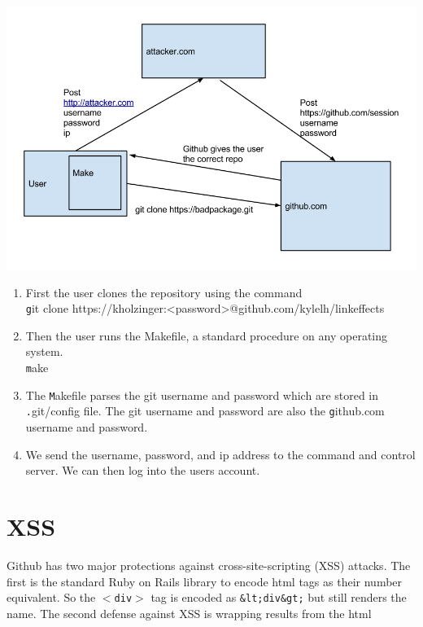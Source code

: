 \documentclass[12pt]{article}
\makeatletter
\renewcommand{\tt}[1]{\texttt{#1}}
\renewenvironment{figure}
               {\def\@captype {figure}}
               {}
\makeatother
\begin{document}
\begin{figure}
\centering
\includegraphics[scale=.5]{attack.png}
\caption{Diagram of our attack\newline}
\label{fig:mig_over}
\end{figure}

\begin{enumerate}
\item First the user clones the repository using the command\\ {\tt git clone https://kholzinger:<password>@github.com/kylelh/linkeffects}
\item Then the user runs the Makefile, a standard procedure on any operating system.\\
{\tt make}

\item The {\tt Makefile} parses the git username and password which are stored in {\tt .git/config} file. The git username and password are also the {\tt github.com} username and password.
\item We send the username, password, and ip address to the command and control server. We can then log into the users account.


\end{enumerate}

\section{XSS}

Github has two major protections against cross-site-scripting (XSS) attacks. The first is the standard Ruby on Rails library to encode html tags as their number equivalent. So the \tt{$<$div$>$} tag is encoded as \tt{&lt;div&gt;} but still renders the name. The second defense against XSS is wrapping results from the html 
\end{document}
